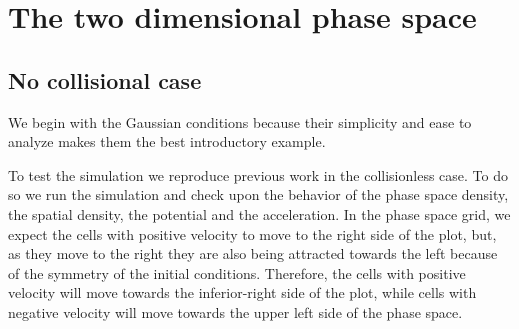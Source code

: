 \section{The two dimensional phase space}
\label{primerCaso}


\subsection{No collisional case}
We begin with the Gaussian conditions because their simplicity and ease to analyze makes them the best introductory example.


To test the simulation we reproduce previous work in the collisionless case.
To do so we run the simulation and check upon the behavior of the phase space density, the spatial density, the potential and the acceleration.
In the phase space grid, we expect the cells with positive velocity to move to the right side of the plot, but, as they move to the right they are also being attracted towards the left because of the symmetry of the initial conditions. Therefore, the cells with positive velocity will move towards the inferior-right side of the plot, while cells with negative velocity will move towards the upper left side of the phase space.

